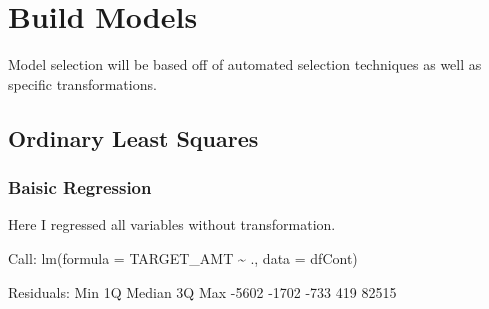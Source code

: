 \documentclass[]{article}
\begin{document}
\hypertarget{build-models}{%
\section{Build Models}\label{build-models}}

Model selection will be based off of automated selection techniques as
well as specific transformations.

\hypertarget{ordinary-least-squares}{%
\subsection{Ordinary Least Squares}\label{ordinary-least-squares}}

\hypertarget{baisic-regression}{%
\subsubsection{Baisic Regression}\label{baisic-regression}}

Here I regressed all variables without transformation.

Call: lm(formula = TARGET\_AMT \textasciitilde{} ., data = dfCont)

Residuals: Min 1Q Median 3Q Max -5602 -1702 -733 419 82515
\end{document}
